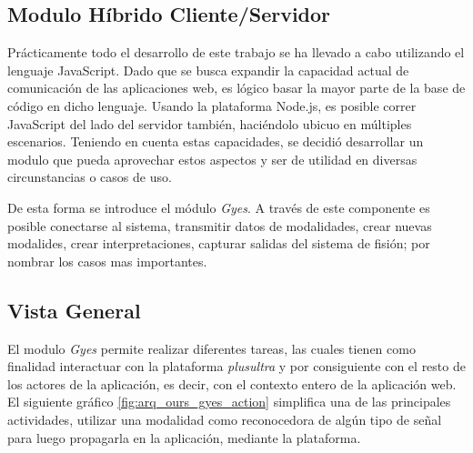 \subsection{Modulo Híbrido Cliente/Servidor}
Prácticamente todo el desarrollo de este trabajo se ha llevado a cabo utilizando el lenguaje JavaScript. Dado que se busca expandir la capacidad actual de comunicación de las aplicaciones web, es lógico basar la mayor parte de la base de código en dicho lenguaje. Usando la plataforma Node.js, es posible correr JavaScript del lado del servidor también, haciéndolo ubicuo en múltiples escenarios. Teniendo en cuenta estas capacidades, se decidió desarrollar un modulo que pueda aprovechar estos aspectos y ser de utilidad en diversas circunstancias o casos de uso.
 
De esta forma se introduce el módulo \emph{Gyes}. A través de este componente es posible conectarse al sistema, transmitir datos de modalidades, crear nuevas modalides, crear interpretaciones, capturar salidas del sistema de fisión; por nombrar los casos mas importantes. 

\subsection{Vista General}
El modulo \emph{Gyes} permite realizar diferentes tareas, las cuales tienen como finalidad interactuar con la plataforma \emph{plusultra} y por consiguiente con el resto de los actores de la aplicación, es decir, con el contexto entero de la aplicación web.
El siguiente gráfico \ref{fig:arq_ours_gyes_action} simplifica una de las principales actividades, utilizar una modalidad como reconocedora de algún tipo de señal para luego propagarla en la aplicación, mediante la plataforma. 

